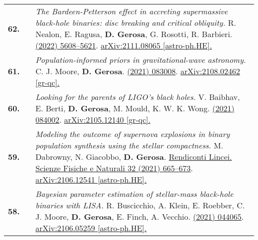 {\begin{longtable}{rp{0.3cm}p{15.8cm}}
%
\textbf{62.} & & \textit{The Bardeen-Petterson effect in accreting supermassive black-hole binaries: disc breaking and critical obliquity.}
\newline{}
R. Nealon, E. Ragusa, \textbf{D. Gerosa}, G. Rosotti, R. Barbieri.
\newline{}
\href{https://doi.org/10.1093/mnras/stab3328}{\mnras 509 (2022) 5608–5621}. \href{https://arxiv.org/abs/2111.08065}{arXiv:2111.08065 [astro-ph.HE].}
\vspace{0.09cm}\\
%
\textbf{61.} & & \textit{Population-informed priors in gravitational-wave astronomy.}
\newline{}
C. J. Moore, \textbf{D. Gerosa}.
\newline{}
\href{https://journals.aps.org/prd/abstract/10.1103/PhysRevD.104.083008}{\prd 104 (2021) 083008}. \href{https://arxiv.org/abs/2108.02462}{arXiv:2108.02462 [gr-qc].}
\vspace{0.09cm}\\
%
\textbf{60.} & & \textit{Looking for the parents of LIGO's black holes.}
\newline{}
V. Baibhav, E. Berti, \textbf{D. Gerosa}, M. Mould, K. W. K. Wong.
\newline{}
\href{https://journals.aps.org/prd/abstract/10.1103/PhysRevD.104.084002}{\prd 104 (2021) 084002}. \href{https://arxiv.org/abs/2105.12140}{arXiv:2105.12140 [gr-qc].}
\vspace{0.09cm}\\
%
\textbf{59.} & & \textit{Modeling the outcome of supernova explosions in binary population synthesis using the stellar compactness.}
\newline{}
M. Dabrowny, N. Giacobbo, \textbf{D. Gerosa}.
\newline{}
\href{https://link.springer.com/article/10.1007/s12210-021-01019-8}{Rendiconti Lincei. Scienze Fisiche e Naturali 32 (2021) 665–673}. \href{https://arxiv.org/abs/2106.12541}{arXiv:2106.12541 [astro-ph.HE].}
\vspace{0.09cm}\\
%
\textbf{58.} & & \textit{Bayesian parameter estimation of stellar-mass black-hole binaries with LISA.}
\newline{}
R. Buscicchio, A. Klein, E. Roebber, C. J. Moore, \textbf{D. Gerosa}, E. Finch, A. Vecchio.
\newline{}
\href{https://journals.aps.org/prd/abstract/10.1103/PhysRevD.104.044065}{\prd 104 (2021) 044065}. \href{https://arxiv.org/abs/2106.05259}{arXiv:2106.05259 [astro-ph.HE].}

\end{longtable}}
